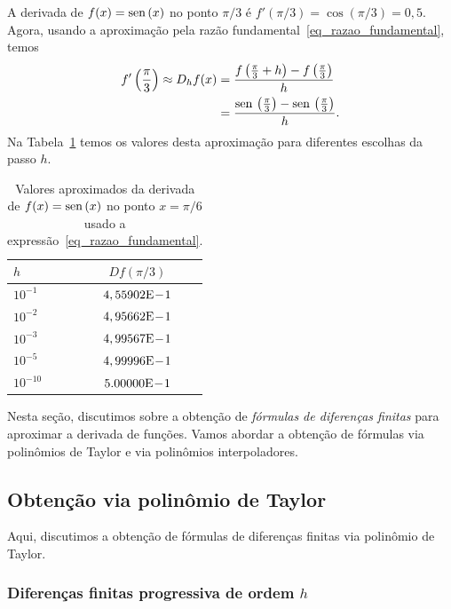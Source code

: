 \begin{ex}\label{ex_intro_deriv}
  A derivada de $f(x) = \operatorname{sen}\,(x)$ no ponto $\pi/3$ é $f'(\pi/3) = \cos(\pi/3)=0,5$. Agora, usando a aproximação pela razão fundamental~\eqref{eq_razao_fundamental}, temos
  \begin{align}
    f'\left(\frac{\pi}{3}\right) \approx D_hf(x) &= \frac{f\left(\frac{\pi}{3}+h\right)-f\left(\frac{\pi}{3}\right)}{h}\\
          &= \frac{\operatorname{sen}\,\left(\frac{\pi}{3}\right)-\operatorname{sen}\,\left(\frac{\pi}{3}\right)}{h}. 
  \end{align}
Na Tabela~\ref{tab:ex_intro_deriv} temos os valores desta aproximação para diferentes escolhas da passo $h$.

\begin{table}[h]
  \centering
  \begin{tabular}{l|c}
    $h$ & $Df(\pi/3)$ \\ \hline
    $10^{-1}$ & $4,55902\mathrm{E}\!-\!1$ \\
    $10^{-2}$ & $4,95662\mathrm{E}\!-\!1$ \\
    $10^{-3}$ & $4,99567\mathrm{E}\!-\!1$ \\
    $10^{-5}$ & $4,99996\mathrm{E}\!-\!1$ \\
    $10^{-10}$ & $5.00000\mathrm{E}\!-\!1$ \\\hline
  \end{tabular}
  \caption{Valores aproximados da derivada de $f(x)=\operatorname{sen}\,(x)$ no ponto $x=\pi/6$ usado a expressão~\eqref{eq_razao_fundamental}.}
  \label{tab:ex_intro_deriv}
\end{table}
\end{ex}

Nesta seção, discutimos sobre a obtenção de \emph{fórmulas de diferenças finitas} para aproximar a derivada de funções. Vamos abordar a obtenção de fórmulas via polinômios de Taylor e via polinômios interpoladores.

\subsection{Obtenção via polinômio de Taylor}

Aqui, discutimos a obtenção de fórmulas de diferenças finitas via polinômio de Taylor.

\subsubsection{Diferenças finitas progressiva de ordem $h$}

